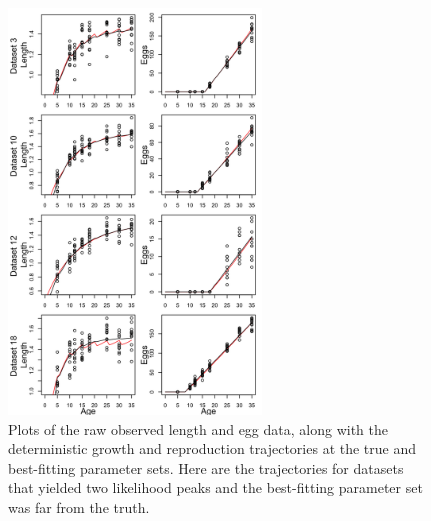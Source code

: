 \documentclass[12pt,reqno,final,pdftex]{amsart}\usepackage[]{graphicx}\usepackage[]{color}
\newenvironment{knitrout}{}{} %
\theoremstyle{plain}
\numberwithin{equation}{part}
\begin{document}
\begin{knitrout}\scriptsize
{}\color{fgcolor}\begin{figure}

\includegraphics[width=0.6\textwidth]{figure/unnamed-chunk-5-1} \hfill{}

\caption[Plots of the raw observed length and egg data, along with the deterministic growth and reproduction trajectories at the true and best-fitting parameter sets]{Plots of the raw observed length and egg data, along with the deterministic growth and reproduction trajectories at the true and best-fitting parameter sets. Here are the trajectories for datasets that yielded two likelihood peaks and the best-fitting parameter set was far from the truth.}\label{fig:unnamed-chunk-5}
\end{figure}


\end{knitrout}
\end{document}
